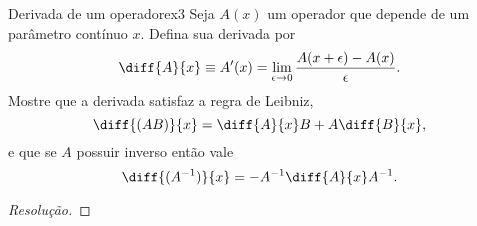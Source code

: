 \begin{exercício}{Derivada de um operador}{ex3}
    Seja \(A(x)\) um operador que depende de um parâmetro contínuo \(x\). Defina sua derivada por
    \begin{equation*}
       \diff{A}{x} \equiv A'(x) = \lim_{\epsilon \to 0}{\frac{A(x + \epsilon) - A(x)}{\epsilon}}.
    \end{equation*}
    Mostre que a derivada satisfaz a regra de Leibniz, 
    \begin{equation*}
       \diff{(AB)}{x} = \diff{A}{x} B + A \diff{B}{x},
    \end{equation*}
    e que se \(A\) possuir inverso então vale
    \begin{equation*}
       \diff{(A^{-1})}{x} = -A^{-1} \diff{A}{x}A^{-1}.
    \end{equation*}
\end{exercício}
\begin{proof}[Resolução]
    
\end{proof}
